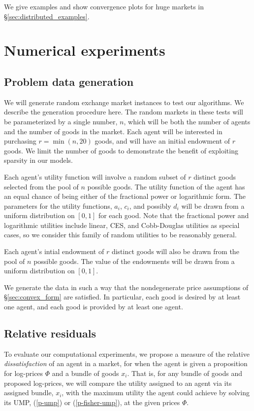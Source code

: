 \documentclass[12pt]{article}
\begin{document}
We give examples and show convergence plots for huge markets in
\S\ref{sec:distributed_examples}.


\section{Numerical experiments}
\label{sec:examples}
\subsection{Problem data generation}
\label{sec:random_prob}

We will generate random exchange market instances to test our algorithms. We
describe the generation procedure here. The random markets in these tests will
be parameterized by a single number, $n$, which will be both the number of
agents and the number of goods in the market. Each agent will be interested in
purchasing $r = \min(n,20)$ goods, and will have an initial endowment of $r$
goods. We limit the number of goods to demonstrate the benefit of exploiting
sparsity in our models.

Each agent's utility function will involve
a random subset of $r$ distinct
goods selected from the pool of $n$ possible goods. The utility function of the agent
has an equal chance of  being either of the fractional power or logarithmic
form. The parameters for the utility functions, $a_i$, $c_i$, and possibly
$d_i$ will be drawn from a uniform distribution on $[0,1]$ for each good. Note
that the fractional power and logarithmic utilities include linear, CES, and
Cobb-Douglas utilities as special cases, so we consider this family of random
utilities to be reasonably general.

Each agent's intial endowment of $r$ distinct goods will also be drawn
from the pool of $n$ possible goods. The value of the endowments
will be drawn from a uniform distribution on $[0,1]$.

We generate the data in such a way that the nondegenerate price assumptions
of \S\ref{sec:convex_form} are satisfied. In particular,
each good is desired by at least one agent, and each good is provided by
at least one agent.

\subsection{Relative residuals}

To evaluate our computational experiments, we propose a measure of the relative
\emph{dissatisfaction} of an agent in a market, for when the agent is given a
proposition for log-prices $\Phi$ and a bundle of goods $x_i$. That is, for any
bundle of goods and proposed log-prices, we will compare the utility assigned
to an agent via its assigned bundle, $x_i$, with the maximum utility the agent
could achieve by solving its UMP, (\ref{p-ump}) or (\ref{p-fisher-ump}), at the
given prices $\Phi$.
\end{document}
